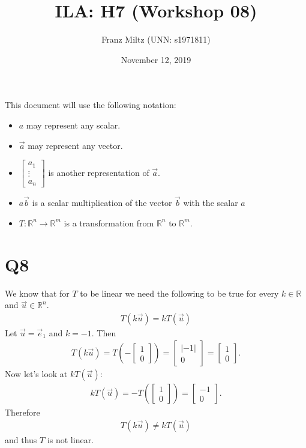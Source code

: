 \documentclass{article}
\title{ILA: H7 (Workshop 08)}
\author{Franz Miltz (UNN: s1971811)}
\date{November 12, 2019}
\begin{document}
\maketitle
This document will use the following notation:
\begin{itemize}
    \item $a$ may represent any scalar.
    \item $\vec{a}$ may represent any vector.
    \item $\begin{bmatrix}
        a_1\\
        \vdots\\
        a_n
    \end{bmatrix}$ is another representation of $\vec a$. 
    \item $a\vec{b}$ is a scalar multiplication of the vector $\vec{b}$ with the scalar $a$
    \item $T:\mathbb{R}^n\to\mathbb{R}^m$ is a transformation from $\mathbb{R}^n$ to $\mathbb{R}^m$.
\end{itemize}
\section*{Q8}
We know that for $T$ to be linear we need the following to be true for every $k\in\mathbb{R}$ and $\vec u \in\mathbb{R}^n$. 
\begin{align*}
    T(k\vec u) = k T(\vec u)
\end{align*}
Let $\vec u = \vec e_1$ and $k = -1$. Then
\begin{align*}
    T(k\vec u) = T\left(-\begin{bmatrix}
        1\\ 0
    \end{bmatrix}\right) = 
    \begin{bmatrix}
        |-1|\\ 0
    \end{bmatrix} =
    \begin{bmatrix}
        1\\0
    \end{bmatrix}.
\end{align*}
Now let's look at $kT(\vec u)$:
\begin{align*}
    kT(\vec u) = -T\left(\begin{bmatrix}
        1\\ 0
    \end{bmatrix}\right)
    = \begin{bmatrix}
        -1\\ 0
    \end{bmatrix}.
\end{align*}
Therefore
\begin{align*}
    T(k\vec u) \not= kT(\vec u)
\end{align*}
and thus $T$ is not linear.
\end{document}

